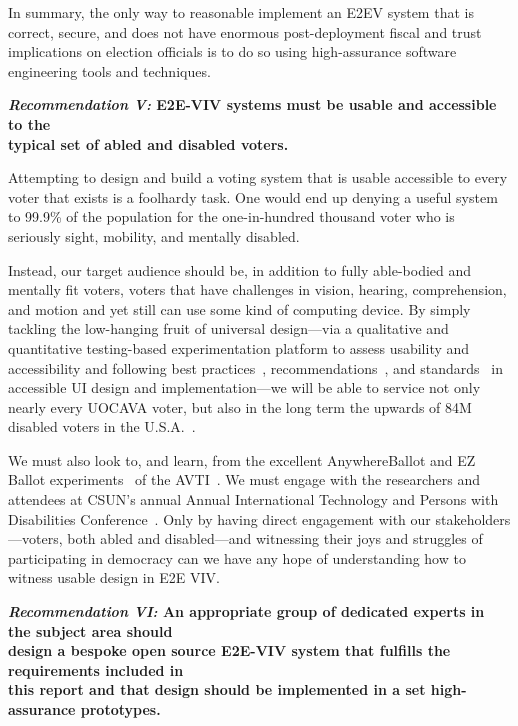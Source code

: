 In summary, the only way to reasonable implement an E2EV system that
is correct, secure, and does not have enormous post-deployment fiscal
and trust implications on election officials is to do so using
high-assurance software engineering tools and techniques.

\begin{center}
  \textbf{\emph{Recommendation V:} E2E-VIV systems must be usable and
  accessible to the\\
  typical set of abled and disabled voters.}
\end{center}

Attempting to design and build a voting system that is usable
accessible to every voter that exists is a foolhardy task. One would
end up denying a useful system to 99.9\% of the population for the
one-in-hundred thousand voter who is seriously sight, mobility, and
mentally disabled. 

Instead, our target audience should be, in addition to fully
able-bodied and mentally fit voters, voters that have challenges in
vision, hearing, comprehension, and motion and yet still can use some
kind of computing device. By simply tackling the low-hanging fruit of
universal design---via a qualitative and quantitative testing-based
experimentation platform to assess usability and accessibility and
following best practices~\cite{materials-at-elections.itif.org},
recommendations~\cite{WAI,Section508,WAVE}, and
standards~\cite{standards} in accessible UI design and
implementation---we will be able to service not only nearly every
UOCAVA voter, but also in the long term the upwards of 84M disabled
voters in the U.S.A.~\cite{Brennen,CensusData}. 

We must also look to, and learn, from the excellent AnywhereBallot and
EZ Ballot experiments~\cite{AnywhereBallot,EZBallot} of the
AVTI~\cite{AVTI}.  We must engage with the researchers and attendees
at CSUN's annual Annual International Technology and Persons with
Disabilities Conference~\cite{CSUN}. Only by having direct engagement
with our stakeholders---voters, both abled and disabled---and
witnessing their joys and struggles of participating in democracy can
we have any hope of understanding how to witness usable design in
E2E VIV.

\begin{center}
  \textbf{\emph{Recommendation VI:} An appropriate group of dedicated
    experts in the subject area should\\
    design a bespoke open source E2E-VIV system that fulfills the
    requirements included in\\
    this report and that design should be implemented in a set
    high-assurance prototypes.}
\end{center}

